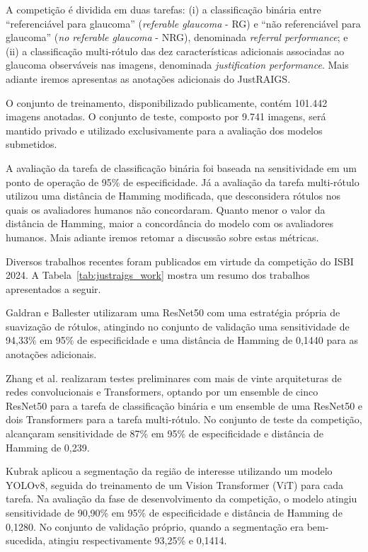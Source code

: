 \documentclass[12pt]{article}
\begin{document}
A competição é dividida em duas tarefas: (i) a classificação binária entre ``referenciável para glaucoma'' (\textit{referable glaucoma} - RG) e ``não referenciável para glaucoma'' (\textit{no referable glaucoma} -  NRG), denominada \textit{referral performance}; e (ii) a classificação multi-rótulo das dez características adicionais associadas ao glaucoma observáveis nas imagens, denominada \textit{justification performance}. Mais adiante iremos apresentas as anotações adicionais do JustRAIGS.

O conjunto de treinamento, disponibilizado publicamente, contém 101.442 imagens anotadas. O conjunto de teste, composto por 9.741 imagens, será mantido privado e utilizado exclusivamente para a avaliação dos modelos submetidos.

A avaliação da tarefa de classificação binária foi baseada na sensitividade em um ponto de operação de 95\% de especificidade. Já a avaliação da tarefa multi-rótulo utilizou uma distância de Hamming modificada, que desconsidera rótulos nos quais os avaliadores humanos não concordaram. Quanto menor o valor da distância de Hamming, maior a concordância do modelo com os avaliadores humanos. Mais adiante iremos retomar a discussão sobre estas métricas.

Diversos trabalhos recentes foram publicados em virtude da competição do ISBI 2024. A Tabela~\ref{tab:justraigs_work} mostra um resumo dos trabalhos apresentados a seguir.

Galdran e Ballester \cite{justraigs_galdran} utilizaram uma ResNet50 com uma estratégia própria de suavização de rótulos, atingindo no conjunto de validação uma sensitividade de 94,33\% em 95\% de especificidade e uma distância de Hamming de 0,1440 para as anotações adicionais.

Zhang et al. \cite{justraigs_zhang} realizaram testes preliminares com mais de vinte arquiteturas de redes convolucionais e Transformers, optando por um ensemble de cinco ResNet50 para a tarefa de classificação binária e um ensemble de uma ResNet50 e dois Transformers para a tarefa multi-rótulo. No conjunto de teste da competição, alcançaram sensitividade de 87\% em 95\% de especificidade e distância de Hamming de 0,239.

Kubrak \cite{justraigs_kubrak} aplicou a segmentação da região de interesse utilizando um modelo YOLOv8, seguida do treinamento de um Vision Transformer (ViT) para cada tarefa. Na avaliação da fase de desenvolvimento da competição, o modelo atingiu sensitividade de 90,90\% em 95\% de especificidade e distância de Hamming de 0,1280. No conjunto de validação próprio, quando a segmentação era bem-sucedida, atingiu respectivamente 93,25\% e 0,1414.
\end{document}
